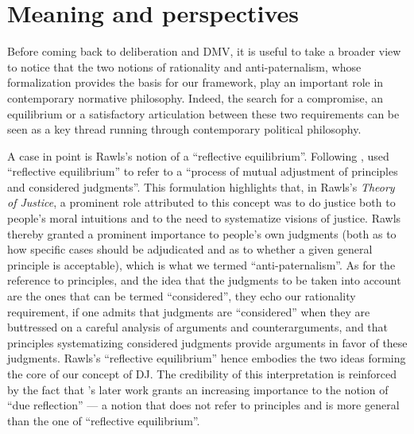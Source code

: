 \documentclass[version=3.21, pagesize, twoside=off, bibliography=totoc, DIV=calc, fontsize=12pt, a4paper, french, english]{scrartcl}
\begin{document}
\section{Meaning and perspectives}
\label{disc}
Before coming back to deliberation and DMV, it is useful to take a broader view to notice that the two notions of rationality and anti-paternalism, whose formalization provides the basis for our framework, play an important role in contemporary normative philosophy. 
Indeed, the search for a compromise, an equilibrium or a satisfactory articulation between these two requirements can be seen as a key thread running through contemporary political philosophy.

A case in point is Rawls’s notion of a “reflective equilibrium”. 
Following \citet{goodman_fact_1983}, \citet[][p.18]{rawls_theory_1999} used “reflective equilibrium” to refer to a “process of mutual adjustment of principles and considered judgments”. 
This formulation highlights that, in Rawls's \emph{Theory of Justice}, a prominent role attributed to this concept was to do justice both to people's moral intuitions and to the need to systematize visions of justice. 
Rawls thereby granted a prominent importance to people's own judgments (both as to how specific cases should be adjudicated and as to whether a given general principle is acceptable), which is what we termed  “anti-paternalism”. 
As for the reference to principles, and the idea that the judgments to be taken into account are the ones that can be termed “considered”, they echo our rationality requirement, if one admits that judgments are  “considered” when they are buttressed on a careful analysis of arguments and counterarguments, and that principles systematizing considered judgments provide arguments in favor of these judgments. 
Rawls's “reflective equilibrium” hence embodies the two ideas forming the core of our concept of \ac{DJ}. 
The credibility of this interpretation is reinforced by the fact that \citeauthor{rawls_political_2005}’s \citeyearpar{rawls_political_2005} later work grants an increasing importance to the notion of “due reflection” --- a notion that does not refer to principles and is more general than the one of “reflective equilibrium”. 
\end{document}
